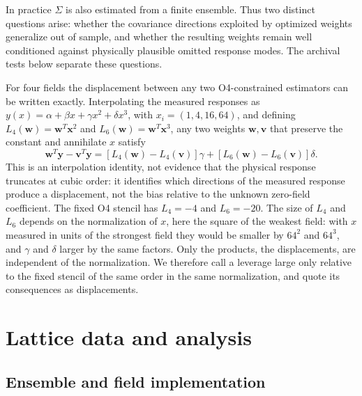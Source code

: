 \documentclass[aps,prd,preprint,nofootinbib,floatfix]{revtex4-2}
\begin{document}
In practice $\Sigma$ is also estimated from a finite ensemble. Thus two distinct questions arise: whether the covariance directions exploited by optimized weights generalize out of sample, and whether the resulting weights remain well conditioned against physically plausible omitted response modes. The archival tests below separate these questions.

For four fields the displacement between any two O4-constrained estimators can be written exactly. Interpolating the measured responses as $y(x)=\alpha+\beta x+\gamma x^2+\delta x^3$, with $x_i=(1,4,16,64)$, and defining $L_4(\bm w)=\bm w^T\bm x^2$ and $L_6(\bm w)=\bm w^T\bm x^3$, any two weights $\bm w,\bm v$ that preserve the constant and annihilate $x$ satisfy
\begin{equation}
\bm w^T\bm y-\bm v^T\bm y=[L_4(\bm w)-L_4(\bm v)]\gamma+[L_6(\bm w)-L_6(\bm v)]\delta .
\label{eq:leverageidentity}
\end{equation}
This is an interpolation identity, not evidence that the physical response truncates at cubic order: it identifies which directions of the measured response produce a displacement, not the bias relative to the unknown zero-field coefficient. The fixed O4 stencil has $L_4=-4$ and $L_6=-20$. The size of $L_4$ and $L_6$ depends on the normalization of $x$, here the square of the weakest field: with $x$ measured in units of the strongest field they would be smaller by $64^2$ and $64^3$, and $\gamma$ and $\delta$ larger by the same factors. Only the products, the displacements, are independent of the normalization. We therefore call a leverage large only relative to the fixed stencil of the same order in the same normalization, and quote its consequences as displacements.


\section{Lattice data and analysis}
\label{sec:methods}
\subsection{Ensemble and field implementation}
\end{document}
